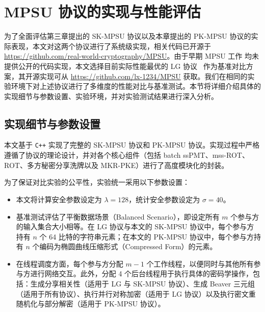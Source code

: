 \section{MPSU 协议的实现与性能评估}\label{sec:mpsu-test}

为了全面评估第三章提出的 SK-MPSU 协议以及本章提出的 PK-MPSU 协议的实际表现，本文对这两个协议进行了系统级实现，相关代码已开源于 \url{https://github.com/real-world-cryptography/MPSU}。由于早期 MPSU 工作 \cite{KS-CRYPTO-2005,Frikken-ACNS-2007,BA-ASIACCS-2012,GNT-eprint-2023} 均未提供公开的代码实现，本文选择目前实际性能最优的 LG 协议~\cite{LG-ASIACRYPT-2023} 作为基准对比方案，其开源实现可从 \url{https://github.com/lx-1234/MPSU} 获取。我们在相同的实验环境下对上述协议进行了多维度的性能对比与基准测试。本节将详细介绍具体的实现细节与参数设置、实验环境，并对实验测试结果进行深入分析。

\subsection{实现细节与参数设置}

本文基于 \texttt{C++} 实现了完整的 SK-MPSU 协议和 PK-MPSU 协议。实现过程中严格遵循了协议的理论设计，并对各个核心组件（包括 batch ssPMT、mss-ROT、ROT、多方秘密分享洗牌以及 MKR-PKE）进行了高度模块化的封装。

为了保证对比实验的公平性，实验统一采用以下参数设置：
\begin{itemize}
\item 本文将计算安全参数设定为 $\lambda = 128$，统计安全参数设定为 $\sigma = 40$。
\item 基准测试评估了平衡数据场景（Balanced Scenario），即设定所有 $m$ 个参与方的输入集合大小相等。在 LG 协议与本文的 SK-MPSU 协议中，每个参与方持有 $n$ 个 64 比特的字符串元素；在本文的 PK-MPSU 协议中，每个参与方持有 $n$ 个编码为椭圆曲线压缩形式（Compressed Form）的元素。
\item 在线程调度方面，每个参与方分配 $m - 1$ 个工作线程，以便同时与其他所有参与方进行网络交互。此外，分配 4 个后台线程用于执行具体的密码学操作，包括：生成分享相关性（适用于 LG 与 SK-MPSU 协议）、生成 Beaver 三元组（适用于所有协议）、执行并行对称加密（适用于 LG 协议）以及执行密文重随机化与部分解密（适用于 PK-MPSU 协议）。
\end{itemize}

